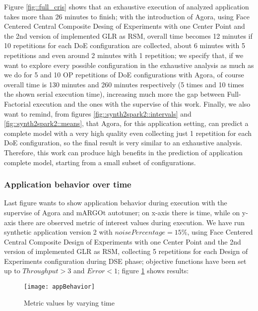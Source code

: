 Figure \ref{fig::full_cris} shows that an exhaustive execution of analyzed application takes more than 26 minutes to finish; with the introduction of Agora, using Face Centered Central Composite Desing of Experiments with one Center Point and the 2nd version of implemented GLR as RSM, overall time becomes 12 minutes if 10 repetitions for each DoE configuration are collected, about 6 minutes with 5 repetitions and even around 2 minutes with 1 repetition; we specify that, if we want to explore every possible configuration in the exhaustive analysis as much as we do for 5 and 10 OP repetitions of DoE configurations with Agora, of course overall time is 130 minutes and 260 minutes respectively (5 times and 10 times the shown serial execution time), increasing much more the gap between Full-Factorial execution and the ones with the supervise of this work. Finally, we also want to remind, from figures \ref{fig::synth2spark2::intervals} and \ref{fig::synth2spark2::means}, that Agora, for this application setting, can predict a complete model with a very high quality even collecting just 1 repetition for each DoE configuration, so the final result is very similar to an exhaustive analysis. Therefore, this work can produce high benefits in the prediction of application complete model, starting from a small subset of configurations.


\subsubsection{Application behavior over time}

Last figure wants to show application behavior during execution with the supervise of Agora and mARGOt autotuner; on x-axis there is time, while on y-axis there are observed metric of interest values during execution. We have run synthetic application version 2 with $noisePercentage = 15\%$, using Face Centered Central Composite Design of Experiments with one Center Point and the 2nd version of implemented GLR as RSM, collecting 5 repetitions for each Design of Experiments configuration during DSE phase; objective functions have been set up to $Throughput > 3$ and $Error < 1$; figure \ref{fig::appBeh} shows results:

\begin{figure}[h]

    \centering
    \texttt{[image: appBehavior]}
    \caption{Metric values by varying time}
    \label{fig::appBeh}
    
\end{figure}

